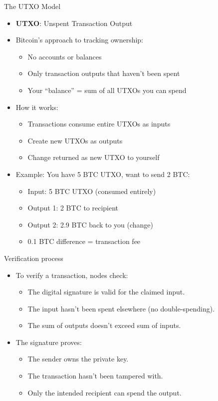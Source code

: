 \documentclass[aspectratio=169, lualatex, handout]{beamer}
\begin{document}
\begin{frame}{The UTXO Model}
	\begin{itemize}
		\item \textbf{UTXO}: Unspent Transaction Output
		\item Bitcoin's approach to tracking ownership:
		      \begin{itemize}
			      \item No accounts or balances
			      \item Only transaction outputs that haven't been spent
			      \item Your ``balance'' = sum of all UTXOs you can spend
		      \end{itemize}
		\item How it works:
		      \begin{itemize}
			      \item Transactions consume entire UTXOs as inputs
			      \item Create new UTXOs as outputs
			      \item Change returned as new UTXO to yourself
		      \end{itemize}
		\item Example: You have 5 BTC UTXO, want to send 2 BTC:
		      \begin{itemize}
			      \item Input: 5 BTC UTXO (consumed entirely)
			      \item Output 1: 2 BTC to recipient
			      \item Output 2: 2.9 BTC back to you (change)
			      \item 0.1 BTC difference = transaction fee
		      \end{itemize}
	\end{itemize}
\end{frame}

\begin{frame}{Verification process}
	\begin{itemize}
		\item To verify a transaction, nodes check:
		      \begin{itemize}
			      \item The digital signature is valid for the claimed input.
			      \item The input hasn't been spent elsewhere (no double-spending).
			      \item The sum of outputs doesn't exceed sum of inputs.
		      \end{itemize}
		\item The signature proves:
		      \begin{itemize}
			      \item The sender owns the private key.
			      \item The transaction hasn't been tampered with.
			      \item Only the intended recipient can spend the output.
		      \end{itemize}
	\end{itemize}
\end{frame}
\end{document}
